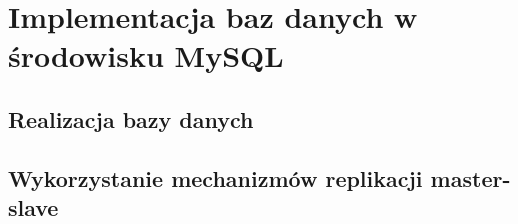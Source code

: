 \chapter{Implementacja baz danych w środowisku MySQL}

\section{Realizacja bazy danych}

\section{Wykorzystanie mechanizmów replikacji master-slave}